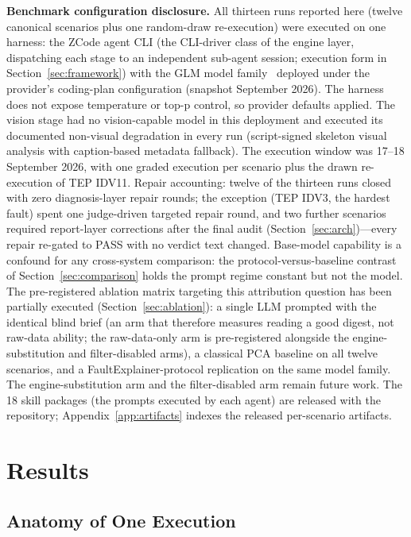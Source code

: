 \documentclass[preprint,10pt]{elsarticle}
\begin{document}
\textbf{Benchmark configuration disclosure.} All thirteen runs reported here (twelve canonical scenarios plus one random-draw re-execution) were executed on one harness: the ZCode agent CLI (the CLI-driver class of the engine layer, dispatching each stage to an independent sub-agent session; execution form in Section~\ref{sec:framework}) with the GLM model family~\cite{glm2024chatglm} deployed under the provider's coding-plan configuration (snapshot September 2026). The harness does not expose temperature or top-p control, so provider defaults applied. The vision stage had no vision-capable model in this deployment and executed its documented non-visual degradation in every run (script-signed skeleton visual analysis with caption-based metadata fallback). The execution window was 17--18 September 2026, with one graded execution per scenario plus the drawn re-execution of TEP IDV11. Repair accounting: twelve of the thirteen runs closed with zero diagnosis-layer repair rounds; the exception (TEP IDV3, the hardest fault) spent one judge-driven targeted repair round, and two further scenarios required report-layer corrections after the final audit (Section~\ref{sec:arch})---every repair re-gated to PASS with no verdict text changed. Base-model capability is a confound for any cross-system comparison: the protocol-versus-baseline contrast of Section~\ref{sec:comparison} holds the prompt regime constant but not the model. The pre-registered ablation matrix targeting this attribution question has been partially executed (Section~\ref{sec:ablation}): a single LLM prompted with the identical blind brief (an arm that therefore measures reading a good digest, not raw-data ability; the raw-data-only arm is pre-registered alongside the engine-substitution and filter-disabled arms), a classical PCA baseline on all twelve scenarios, and a FaultExplainer-protocol replication on the same model family. The engine-substitution arm and the filter-disabled arm remain future work. The 18 skill packages (the prompts executed by each agent) are released with the repository; Appendix~\ref{app:artifacts} indexes the released per-scenario artifacts.

\section{Results}
\label{sec:results}

\subsection{Anatomy of One Execution}
\label{sec:anatomy}
\end{document}
